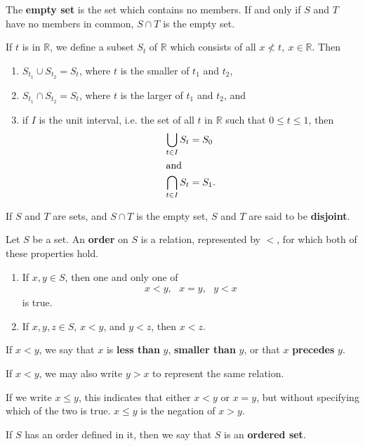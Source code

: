 \documentclass[12pt]{article}
\begin{document}
\begin{defn}
  The \textbf{empty set} is the set which contains no members. If and only if $S$ and
  $T$ have no members in common, $S \cap T$ is the empty set.
\end{defn}

\begin{exm}
  If $t$ is in $\mathbb{R}$, we define a subset $S_t$ of $\mathbb{R}$ which consists
  of all $x \nless t,\ x \in \mathbb{R}$. Then
  \begin{enumerate}
    \item
      $S_{t_1} \cup S_{t_2} = S_t$, where $t$ is the smaller of $t_1$ and $t_2$,
    \item
      $S_{t_1} \cap S_{t_2} = S_t$, where $t$ is the larger of $t_1$ and $t_2$, and
    \item
      if $I$ is the unit interval, i.e. the set of all $t$ in $\mathbb{R}$ such that
      $0 \leq t \leq 1$, then
      \begin{align*}
        \bigcup_{t \in I}S_t &= S_0\\
        \shortintertext{and}
        \bigcap_{t \in I}S_t &= S_1.
      \end{align*}
  \end{enumerate}
\end{exm}

\begin{defn}
  If $S$ and $T$ are sets, and $S \cap T$ is the empty set, $S$ and $T$ are said to
  be \textbf{disjoint}.
\end{defn}

\begin{defn}
  Let $S$ be a set. An \textbf{order} on $S$ is a relation, represented by $<$, for
  which both of these properties hold.
  \begin{enumerate}
    \item
      If $x,y \in S$, then one and only one of
      \begin{align*}
        x < y,\ \ \ x = y,\ \ \ y < x
      \end{align*}
      is true.
    \item
      If $x,y,z \in S$, $x < y$, and $y < z$, then $x < z$.
  \end{enumerate}

  If $x < y$, we say that $x$ is \textbf{less than} $y$, \textbf{smaller than} $y$,
  or that $x$ \textbf{precedes} $y$.

  If $x < y$, we may also write $y > x$ to represent the same relation.

  If we write $x \leq y$, this indicates that either $x < y$ or $x = y$, but without
  specifying which of the two is true. $x \leq y$ is the negation of $x > y$.

  If $S$ has an order defined in it, then we say that $S$ is an \textbf{ordered set}.
\end{defn}
\end{document}
